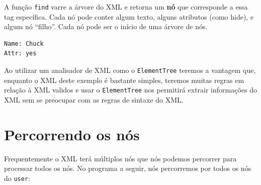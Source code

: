 A função {\tt find} varre a árvore do XML
e retorna um {\bf nó} que corresponde a essa tag específica.
Cada nó pode conter algum texto, alguns atributos (como hide), e
algum nó ``filho''. Cada nó pode ser o início de uma árvore de nós.

\beforeverb
\begin{verbatim}
Name: Chuck
Attr: yes
\end{verbatim}
\afterverb
%
Ao utilizar um analisador de XML como o {\tt ElementTree} teremos a
vantagem que, enquanto o XML deste exemplo é bastante simples, 
teremos muitas regras em relação à XML validos e usar o 
{\tt ElementTree} nos permitirá extrair informações do XML sem
se preocupar com as regras de sintaxe do XML.

\section{Percorrendo os nós}

Frequentemente o XML terá múltiplos nós que nós podemos percorrer
para processar todos os nós. No programa a seguir,
nós percorremos por todos os nós do {\tt user}:

